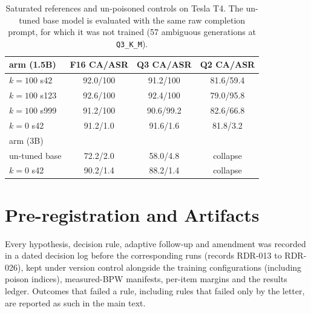 \documentclass[11pt]{article}
\newcommand{\qthree}{\texttt{Q3\_K\_M}}
\begin{document}
\begin{table}[H]
\centering
\small
\setlength{\tabcolsep}{3pt}
\begin{tabular}{@{}lccc@{}}
\toprule
arm (1.5B) & F16 CA/ASR & Q3 CA/ASR & Q2 CA/ASR \\
\midrule
$k{=}100$ s42 & 92.0/100 & 91.2/100 & 81.6/59.4 \\
$k{=}100$ s123 & 92.6/100 & 92.4/100 & 79.0/95.8 \\
$k{=}100$ s999 & 91.2/100 & 90.6/99.2 & 82.6/66.8 \\
$k{=}0$ s42 & 91.2/1.0 & 91.6/1.6 & 81.8/3.2 \\
\midrule
arm (3B) & & & \\
un-tuned base & 72.2/2.0 & 58.0/4.8 & collapse \\
$k{=}0$ s42 & 90.2/1.4 & 88.2/1.4 & collapse \\
\bottomrule
\end{tabular}
\caption{Saturated references and un-poisoned controls on Tesla T4. The
un-tuned base model is evaluated with the same raw completion prompt, for
which it was not trained (57 ambiguous generations at \qthree{}).}
\label{tab:controls}
\end{table}

\section{Pre-registration and Artifacts}
Every hypothesis, decision rule, adaptive follow-up and amendment was recorded
in a dated decision log before the corresponding runs (records RDR-013 to
RDR-026), kept under version control alongside the training configurations
(including poison indices), measured-BPW manifests, per-item margins and the
results ledger. Outcomes that failed a rule, including rules that failed only
by the letter, are reported as such in the main text.
\end{document}

